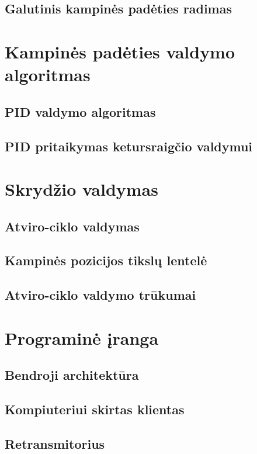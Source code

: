 \documentclass[12pt, a4paper, lithuanian, final]{article}
\begin{document}
\subsection{Galutinis kampinės padėties radimas}



\section{Kampinės padėties valdymo algoritmas}
\subsection{PID valdymo algoritmas}
\subsection{PID pritaikymas ketursraigčio valdymui}



\section{Skrydžio valdymas}
\subsection{Atviro-ciklo valdymas}
\subsection{Kampinės pozicijos tikslų lentelė}
\subsection{Atviro-ciklo valdymo trūkumai}



\section{Programinė įranga}
\subsection{Bendroji architektūra}
\subsection{Kompiuteriui skirtas klientas}
\subsection{Retransmitorius}
\end{document}
